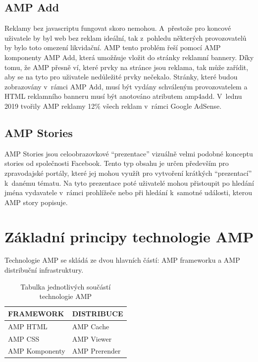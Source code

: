 \subsection*{AMP Add}
Reklamy bez javascriptu fungovat skoro nemohou. A~přestože pro koncové uživatele by byl web bez reklam ideální, tak z~pohledu některých provozovatelů by bylo toto omezení likvidační. AMP tento problém řeší pomocí AMP komponenty AMP Add, která umožňuje vložit do stránky reklamní bannery. Díky tomu, že AMP přesně ví, které prvky na stránce jsou reklama, tak může zařídit, aby se na tyto pro uživatele nedůležité prvky nečekalo. Stránky, které budou zobrazovány v~rámci AMP Add, musí být vydány schváleným provozovatelem a HTML reklamního banneru musí být anotováno atributem amp4add\cite[Ch.\ 6, p.\ 280]{VzhuruDoAMP}.
V~lednu 2019 tvořily AMP reklamy 12\% všech reklam v~rámci Google AdSense\cite{abner_2019}.
\subsection*{AMP Stories}
AMP Stories jsou celoobrazovkové “prezentace” vizuálně velmi podobné konceptu stories od společnosti Facebook. Tento typ obsahu je určen především pro zpravodajské portály, které jej mohou využít pro vytvoření krátkých
“prezentací” k~danému tématu. Na tyto prezentace poté uživatelé mohou přistoupit po hledání jména
vydavatele v~rámci prohlížeče nebo při hledání k~samotné události, kterou AMP story popisuje\cite[Ch.\ 6, p.\ 290]{VzhuruDoAMP}.

\section{Základní principy technologie AMP}
Technologie AMP se skládá ze dvou hlavních částí: AMP frameworku a AMP distribuční infrastruktury. 

\begin{table}[H]
	\caption{Tabulka jednotlivých součástí technologie AMP} 
	\centering
	\begin{tabular}{m{15em} | m{15em}}
		\toprule
		\cmidrule(r){1-2}
		FRAMEWORK & DISTRIBUCE \\
		\midrule
		AMP HTML & AMP Cache \\
		AMP CSS & AMP Viewer \\
		AMP Komponenty & AMP Prerender \\
		\bottomrule
	\end{tabular}
	\label{tab:Součásti technologie AMP}
\end{table}

